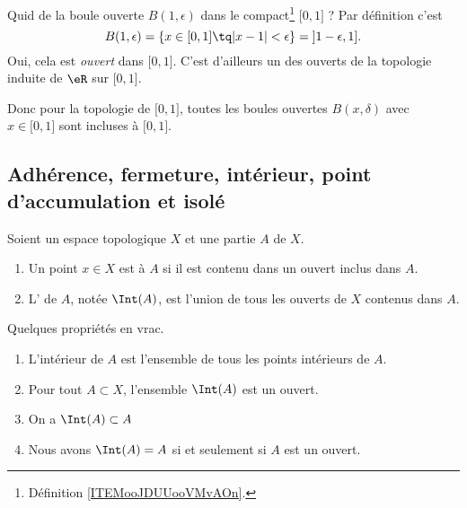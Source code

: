 \begin{example}  \label{ExKYZwYxn}
    Quid de la boule ouverte \( B(1,\epsilon)\) dans le compact\footnote{Définition \ref{ITEMooJDUUooVMvAOn}.} \( \mathopen[ 0 , 1 \mathclose]\) ? Par définition c'est
    \begin{equation}
        B(1,\epsilon)=\{ x\in\mathopen[ 0 , 1 \mathclose]\tq | x-1 |<\epsilon \}=\mathopen] 1-\epsilon , 1 \mathclose].
    \end{equation}
    Oui, cela est \emph{ouvert} dans \( \mathopen[ 0 , 1 \mathclose]\). C'est d'ailleurs un des ouverts de la topologie induite de \( \eR\) sur \( \mathopen[ 0 , 1 \mathclose]\).

    Donc pour la topologie de \( \mathopen[ 0 , 1 \mathclose]\), toutes les boules ouvertes \( B(x,\delta)\) avec \( x\in\mathopen[ 0 , 1 \mathclose]\) sont incluses à \( \mathopen[ 0 , 1 \mathclose]\).
\end{example}


\subsection{Adhérence, fermeture, intérieur, point d'accumulation et isolé}

\begin{definition}      \label{DEFooSVWMooLpAVZRInt}
    Soient un espace topologique \( X\) et une partie \( A\) de \( X\).
    \begin{enumerate}
        \item
            Un point \( x\in X\) est  à \( A\) si il est contenu dans un ouvert inclus dans \( A\).
        \item
            L' de \( A\), notée \( \Int(A)\), est l'union de tous les ouverts de \( X\) contenus dans \( A\).
    \end{enumerate}
\end{definition}

\begin{lemma}
    Quelques propriétés en vrac.
    \begin{enumerate}
        \item   \label{ITEMooHLIMooJEacKt}
            L'intérieur de \( A\) est l'ensemble de tous les points intérieurs de \( A\).
        \item \label{ITEMooYTXSooMyiBpMgzK}
            Pour tout \( A \subset X\), l'ensemble \( \Int(A)\) est un ouvert.
\item   \label{ITEMooYYFDooHgsRfV}
    On a  \( \Int(A) \subset A \)
\item \label{ITEMooTDXFooFdyLeO}
        Nous avons \( \Int(A) = A \) si et seulement si $A$ est un ouvert.
    \end{enumerate}
\end{lemma}

